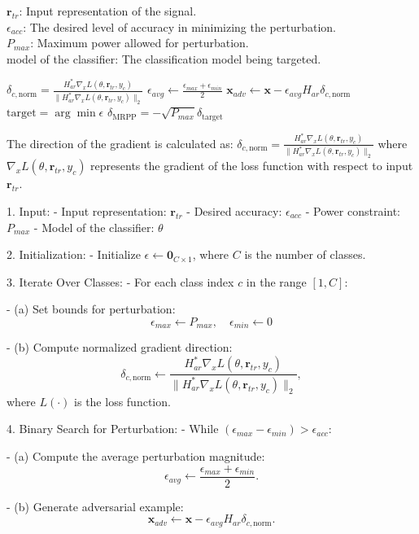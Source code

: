 $\mathbf{r}_{tr}$: Input representation of the signal. \\
$\epsilon_{acc}$: The desired level of accuracy in minimizing the perturbation. \\
$P_{max}$: Maximum power allowed for perturbation. \\
model of the classifier: The classification model being targeted.

$\delta_{c,\text{norm}} = \frac{H_{ar}^* \nabla_x L(\theta, \mathbf{r}_{tr}, y_c)}{\|H_{ar}^* \nabla_x L(\theta, \mathbf{r}_{tr}, y_c)\|_2}$
$\epsilon_{avg} \leftarrow \frac{\epsilon_{max} + \epsilon_{min}}{2}$
$\mathbf{x}_{adv} \leftarrow \mathbf{x} - \epsilon_{avg} H_{ar} \delta_{c,\text{norm}}$
$\text{target} = \arg \min \epsilon$
$\delta_{\text{MRPP}} = -\sqrt{P_{max}} \delta_{\text{target}}$


The direction of the gradient is calculated as:
$\delta_{c,\text{norm}} = \frac{H_{ar}^* \nabla_x L(\theta, \mathbf{r}_{tr}, y_c)}{\|H_{ar}^* \nabla_x L(\theta, \mathbf{r}_{tr}, y_c)\|_2}$
where $\nabla_x L(\theta, \mathbf{r}_{tr}, y_c)$ represents the gradient of the loss function with respect to input $\mathbf{r}_{tr}$.

1. Input:
   - Input representation: $\mathbf{r}_{tr}$
   - Desired accuracy: $\epsilon_{acc}$
   - Power constraint: $P_{max}$
   - Model of the classifier: $\theta$

2. Initialization:
   - Initialize $\epsilon \gets \mathbf{0}_{C \times 1}$, where $C$ is the number of classes.

3. Iterate Over Classes:
   - For each class index $c$ in the range $[1, C]$:
     
     - (a) Set bounds for perturbation:
       \[
       \epsilon_{max} \gets P_{max}, \quad \epsilon_{min} \gets 0
       \]

     - (b) Compute normalized gradient direction:
       \[
       \delta_{c,\text{norm}} \gets \frac{H_{ar}^* \nabla_x L(\theta, \mathbf{r}_{tr}, y_c)}{\|H_{ar}^* \nabla_x L(\theta, \mathbf{r}_{tr}, y_c)\|_2},
       \]
       where $L(\cdot)$ is the loss function.

4. Binary Search for Perturbation:
   - While $(\epsilon_{max} - \epsilon_{min}) > \epsilon_{acc}$:
     
     - (a) Compute the average perturbation magnitude:
       \[
       \epsilon_{avg} \gets \frac{\epsilon_{max} + \epsilon_{min}}{2}.
       \]

     - (b) Generate adversarial example:
       \[
       \mathbf{x}_{adv} \gets \mathbf{x} - \epsilon_{avg} H_{ar} \delta_{c,\text{norm}}.
       \]

